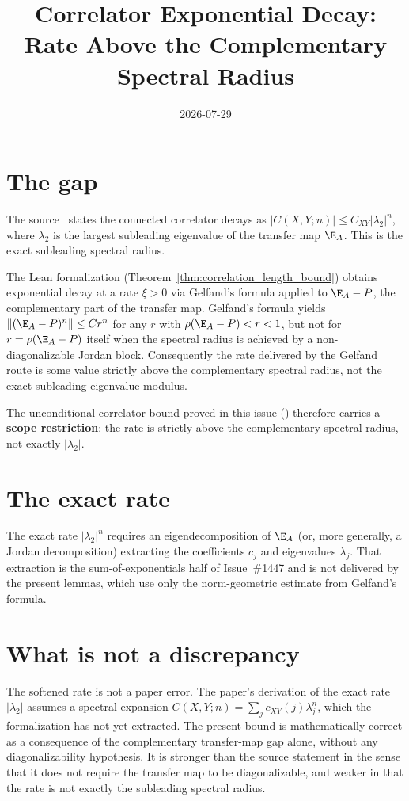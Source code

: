\documentclass{article}
\title{Correlator Exponential Decay: Rate Above the Complementary Spectral Radius}
\author{}
\date{2026-07-29}
\begin{document}
\maketitle

\section{The gap}

The source~\cite[Section~II.B.3]{Cirac2021Matrix} states the connected
correlator decays as $|C(X,Y;n)|\le C_{XY}|\lambda_2|^n$, where
$\lambda_2$ is the largest subleading eigenvalue of the transfer map
$\E_A$.  This is the exact subleading spectral radius.

The Lean formalization 
(Theorem~\ref{thm:correlation_length_bound}) obtains exponential decay
at a rate $\xi>0$ via Gelfand's formula applied to
$\E_A-P$, the complementary part of the transfer map.  Gelfand's
formula yields $\|(\E_A-P)^n\|\le Cr^n$ for any $r$ with
$\rho(\E_A-P)<r<1$, but not for $r=\rho(\E_A-P)$ itself when the
spectral radius is achieved by a non-diagonalizable Jordan block.
Consequently the rate delivered by the Gelfand route is some value
strictly above the complementary spectral radius, not the exact
subleading eigenvalue modulus.

The unconditional correlator bound proved in this issue
() therefore carries a
\textbf{scope restriction}: the rate is strictly above the
complementary spectral radius, not exactly $|\lambda_2|$.

\section{The exact rate}

The exact rate $|\lambda_2|^n$ requires an eigendecomposition of
$\E_A$ (or, more generally, a Jordan decomposition) extracting the
coefficients $c_j$ and eigenvalues $\lambda_j$.  That extraction is
the sum-of-exponentials half of Issue~\#1447 and is not delivered by
the present lemmas, which use only the norm-geometric estimate from
Gelfand's formula.

\section{What is not a discrepancy}

The softened rate is not a paper error.  The paper's derivation of the
exact rate $|\lambda_2|$ assumes a spectral expansion
$C(X,Y;n)=\sum_j c_{XY}(j)\lambda_j^n$, which the formalization has
not yet extracted.  The present bound is mathematically correct as a
consequence of the complementary transfer-map gap alone, without any
diagonalizability hypothesis.  It is stronger than the source statement
in the sense that it does not require the transfer map to be
diagonalizable, and weaker in that the rate is not exactly the
subleading spectral radius.



\end{document}
